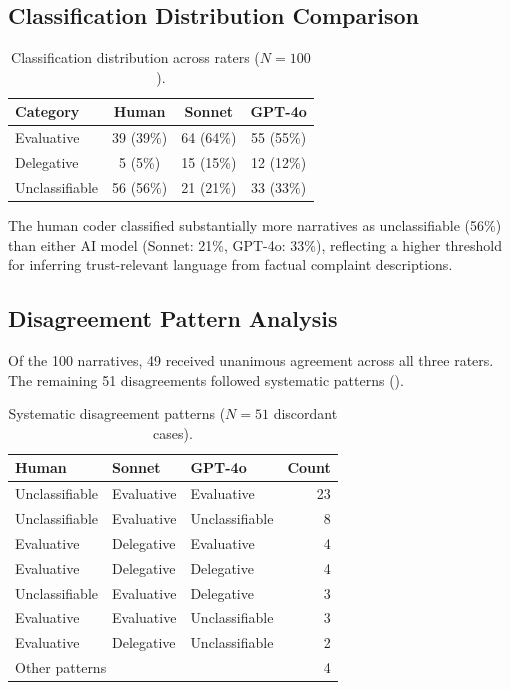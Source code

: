 \subsection{Classification Distribution Comparison}

\begin{table}[H]
\centering
\caption{Classification distribution across raters ($N = 100$).}
\label{tab:class_dist}
\begin{tabular}{lccc}
\toprule
Category & Human & Sonnet & GPT-4o \\
\midrule
Evaluative      & 39 (39\%) & 64 (64\%) & 55 (55\%) \\
Delegative      &  5 (5\%)  & 15 (15\%) & 12 (12\%) \\
Unclassifiable  & 56 (56\%) & 21 (21\%) & 33 (33\%) \\
\bottomrule
\end{tabular}
\end{table}

The human coder classified substantially more narratives as unclassifiable (56\%) than either AI model (Sonnet: 21\%, GPT-4o: 33\%), reflecting a higher threshold for inferring trust-relevant language from factual complaint descriptions.

\subsection{Disagreement Pattern Analysis}

Of the 100 narratives, 49 received unanimous agreement across all three raters. The remaining 51 disagreements followed systematic patterns ().

\begin{table}[H]
\centering
\caption{Systematic disagreement patterns ($N = 51$ discordant cases).}
\label{tab:disagree_patterns}
\begin{tabular}{lllr}
\toprule
Human & Sonnet & GPT-4o & Count \\
\midrule
Unclassifiable & Evaluative  & Evaluative      & 23 \\
Unclassifiable & Evaluative  & Unclassifiable  &  8 \\
Evaluative     & Delegative  & Evaluative      &  4 \\
Evaluative     & Delegative  & Delegative      &  4 \\
Unclassifiable & Evaluative  & Delegative      &  3 \\
Evaluative     & Evaluative  & Unclassifiable  &  3 \\
Evaluative     & Delegative  & Unclassifiable  &  2 \\
\multicolumn{3}{l}{Other patterns}              &  4 \\
\bottomrule
\end{tabular}
\end{table}

